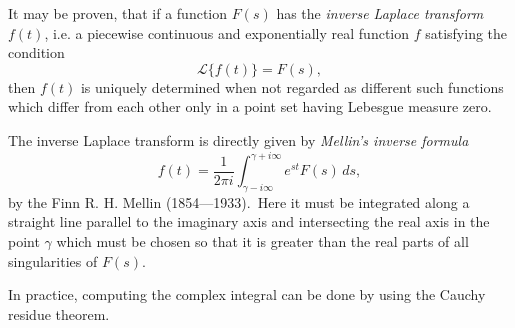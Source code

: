 \documentclass[12pt]{article}
\begin{document}
It may be proven, that if a function $F(s)$ has the {\em inverse Laplace transform} $f(t)$, i.e. a piecewise continuous and exponentially  real function $f$ satisfying the condition
   $$\mathcal{L}\{f(t)\} = F(s),$$
then $f(t)$ is uniquely determined when not regarded as different such functions which differ from each other only in a point set having Lebesgue measure zero.  

The inverse Laplace transform is directly given by {\em Mellin's inverse formula}
  $$f(t)= \frac{1}{2\pi i}\int_{\gamma-i\infty}^{\gamma+i\infty}e^{st}F(s)\,ds,$$
by the Finn R. H. Mellin (1854---1933).\, Here it must be integrated along a straight line parallel to the imaginary axis and intersecting the real axis in the point $\gamma$ which must be chosen so that it is greater than the real parts of all singularities of $F(s)$.

In practice, computing the complex integral can be done by using the Cauchy residue theorem.
\end{document}
